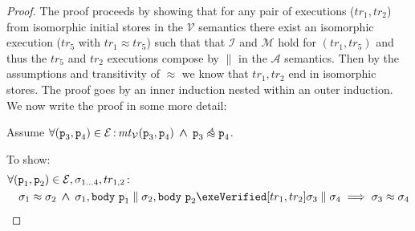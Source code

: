 \documentclass[runningheads,a4paper]{llncs}
\DeclareMathOperator{\band}{\bm{\;\land\;}}
\DeclareMathOperator{\suchthat}{:}
\newcommand*{\qvars}[2]{#1_{#2}}
\newcommand*{\cardinality}[1]{\left|{#1}\right|}
\newcommand{\tr}{tr}
\newcommand*{\sima}[1]{%
  \mathrel{\vcenter{\offinterlineskip
  \hbox{$\scriptscriptstyle\,\mathcal{#1}$}\vskip-.00ex\hbox{$\sim$}\vskip-.35ex\hbox{$\sim$}}}}
\newcommand*\iso{\approx}
\newcommand*\isoa{\sima{A}}
\newcommand*{\equivmap}{\mathcal{E}}
\newcommand*{\parcomp}{\parallel}
\newcommand*{\muttermname}{\mathit{mt}}
\newcommand*{\mutterm}[3]{{\muttermname}_{#1}(#2,#3)}
\newcommand*\Asemantics{\mathcal{A}}
\newcommand*\asemantics{$\Asemantics$ semantics}
\newcommand*\Vsemantics{\mathcal{V}}
\newcommand*\vsemantics{$\Vsemantics$ semantics}
\newcommand*{\body}{\mathtt{body}}
\newcommand*{\fun}{\texttt{p}}
\newcommand*{\isoR}{\mathcal{I}}
\newcommand*{\mutR}{\mathcal{M}}
\newcommand*{\store}{\sigma}
\newcommand*{\isoref}{\hyperref[def:global isomorphism]{\ensuremath{\iso}}}
\begin{document}
\begin{proof}
The proof proceeds by showing that for any pair of executions ($\tr_1,\tr_2$) from isomorphic initial stores in the \vsemantics{} there exist an isomorphic execution ($\tr_5$ with $\tr_1\iso\tr_5$) such that that $\isoR$ and $\mutR$ hold for $(\tr_1,\tr_5)$ and thus the $\tr_5$ and $\tr_2$ executions compose by $\parcomp$ in the \asemantics{}. 
%
Then by the assumptions and transitivity of \isoref{} we know that $\tr_1,\tr_2$ end in isomorphic stores. 
%
The proof goes by an inner induction nested within an outer induction. We now write the proof in some more detail:

Assume $\forall (\fun_3,\fun_4) \in \equivmap \suchthat \mutterm{\Vsemantics}{\fun_3}{\fun_4} \band \fun_3 \isoa \fun_4$. 

To show:
\[\begin{aligned}
&\forall (\fun_1,\fun_2) \in \equivmap, \qvars{\store}{1 \ldots 4}, \qvars{\tr}{1,2} \suchthat  \\
&\quad	\store_1 \iso \store_2 \band 
        \store_1,\body~\fun_1 \parcomp \store_2,\body~\fun_2 \exeVerified[\tr_1,\tr_2] \store_3 \parcomp \store_4
	\implies 
	\store_3 \iso \store_4
\end{aligned}\]

%


\end{proof}
\end{document}
